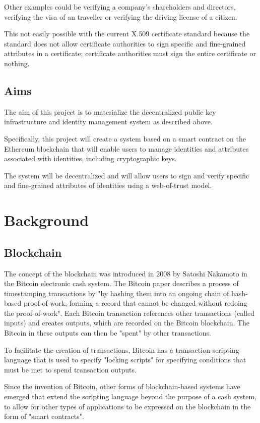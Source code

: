 \documentclass[a4paper]{report}
\begin{document}
	Other examples could be verifying a company's shareholders and directors, verifying the visa of an traveller or verifying the driving license of a citizen.
	
	This not easily possible with the current X.509 certificate standard because the standard does not allow certificate authorities to sign specific and fine-grained attributes in a certificate; certificate authorities must sign the entire certificate or nothing.
	
	
	\section{Aims}
	The aim of this project is to materialize the decentralized public key infrastructure and identity management system as described above.
	
	Specifically, this project will create a system based on a smart contract on the Ethereum blockchain that will enable users to manage identities and attributes associated with identities, including cryptographic keys.
	
	The system will be decentralized and will allow users to sign and verify specific and fine-grained attributes of identities using a web-of-trust model.
	
	\chapter{Background}
	\section{Blockchain}
	The	concept of the blockchain was introduced in 2008 by Satoshi Nakamoto in the Bitcoin electronic cash system.\cite{9} The Bitcoin paper describes a process of timestamping transactions by "by hashing them into an ongoing chain of hash-based proof-of-work, forming a record that cannot be changed without redoing the proof-of-work". Each Bitcoin transaction references other transactions (called inputs) and creates outputs, which are recorded on the Bitcoin blockchain. The Bitcoin in these outputs can then be "spent" by other transactions.
	
	To facilitate the creation of transactions, Bitcoin has a transaction scripting language that is used to specify "locking scripts" for specifying conditions that must be met to spend transaction outputs.
	
	Since the invention of Bitcoin, other forms of blockchain-based systems have emerged that extend the scripting language beyond the purpose of a cash system, to allow for other types of applications to be expressed on the blockchain in the form of "smart contracts".
	
\end{document}
